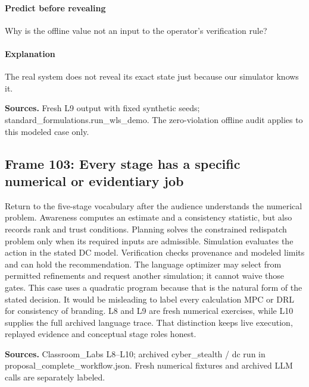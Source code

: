 \documentclass[11pt]{article}
\begin{document}
\paragraph{Predict before revealing}Why is the offline value not an input to the operator's verification rule?
\paragraph{Explanation}The real system does not reveal its exact state just because our simulator knows it.
\par\nopagebreak\begin{minipage}{\linewidth}{\footnotesize\color{slate}\textbf{Sources.} Fresh L9 output with fixed synthetic seeds; standard\_formulations.run\_wls\_demo. The zero-violation offline audit applies to this modeled case only.\par}\end{minipage}\par\medskip
\subsection*{Frame 103: Every stage has a specific numerical or evidentiary job}
Return to the five-stage vocabulary after the audience understands the numerical problem. Awareness computes an estimate and a consistency statistic, but also records rank and trust conditions. Planning solves the constrained redispatch problem only when its required inputs are admissible. Simulation evaluates the action in the stated DC model. Verification checks provenance and modeled limits and can hold the recommendation. The language optimizer may select from permitted refinements and request another simulation; it cannot waive those gates. This case uses a quadratic program because that is the natural form of the stated decision. It would be misleading to label every calculation MPC or DRL for consistency of branding. L8 and L9 are fresh numerical exercises, while L10 supplies the full archived language trace. That distinction keeps live execution, replayed evidence and conceptual stage roles honest.\par
\par\nopagebreak\begin{minipage}{\linewidth}{\footnotesize\color{slate}\textbf{Sources.} Classroom\_Labs L8--L10; archived cyber\_stealth / dc run in proposal\_complete\_workflow.json. Fresh numerical fixtures and archived LLM calls are separately labeled.\par}\end{minipage}\par\medskip
\end{document}
